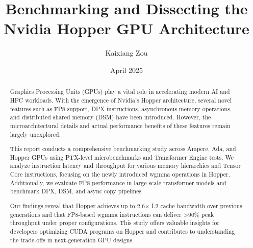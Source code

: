 \documentclass[12pt]{article}
\title{Benchmarking and Dissecting the Nvidia Hopper GPU Architecture}
\author{Kaixiang Zou}
\date{April 2025}
\begin{document}
\maketitle

\begin{abstract}
Graphics Processing Units (GPUs) play a vital role in accelerating modern AI and HPC workloads. With the emergence of Nvidia's Hopper architecture, several novel features such as FP8 support, DPX instructions, asynchronous memory operations, and distributed shared memory (DSM) have been introduced. However, the microarchitectural details and actual performance benefits of these features remain largely unexplored. 

This report conducts a comprehensive benchmarking study across Ampere, Ada, and Hopper GPUs using PTX-level microbenchmarks and Transformer Engine tests. We analyze instruction latency and throughput for various memory hierarchies and Tensor Core instructions, focusing on the newly introduced wgmma operations in Hopper. Additionally, we evaluate FP8 performance in large-scale transformer models and benchmark DPX, DSM, and async copy pipelines.

Our findings reveal that Hopper achieves up to 2.6× L2 cache bandwidth over previous generations and that FP8-based wgmma instructions can deliver >90\% peak throughput under proper configurations. This study offers valuable insights for developers optimizing CUDA programs on Hopper and contributes to understanding the trade-offs in next-generation GPU designs.
\end{abstract}


\tableofcontents










\end{document}
